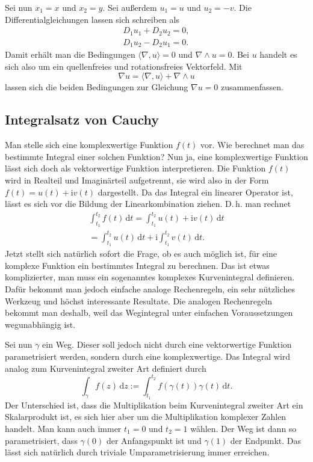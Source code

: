 \documentclass[a4paper,11pt,fleqn,twocolumn,twoside]{scrartcl}
\numberwithin{equation}{section}
\newcommand{\ui}{\mathrm i}
\begin{document}
Sei nun $x_1=x$ und $x_2=y$. Sei außerdem $u_1=u$
und $u_2=-v$. Die Differentialgleichungen lassen sich schreiben als
\begin{gather*}
D_1u_1+D_2u_2=0,\\
D_1u_2-D_2u_1=0.
\end{gather*}
Damit erhält man die Bedingungen $\langle\nabla,u\rangle=0$ und
$\nabla\wedge u=0$. Bei $u$ handelt es sich also um ein
quellenfreies und rotationsfreies Vektorfeld. Mit
\begin{equation}
\nabla u = \langle\nabla, u\rangle+\nabla\wedge u
\end{equation}
lassen sich die beiden Bedingungen zur Gleichung $\nabla u=0$
zusammenfassen.

\subsection{Integralsatz von Cauchy}

Man stelle sich eine komplexwertige Funktion $f(t)$ vor.
Wie berechnet man das bestimmte Integral einer solchen Funktion?
Nun ja, eine komplexwertige Funktion lässt sich doch als vektorwertige
Funktion interpretieren. Die Funktion $f(t)$ wird in Realteil und
Imaginärteil aufgetrennt, sie wird also in der Form
$f(t)=u(t)+\ui v(t)$ dargestellt.
Da das Integral ein linearer Operator ist,
lässt es sich vor die Bildung der Linearkombination ziehen.
D.\,h. man rechnet
\begin{gather*}
\int_{t_1}^{t_2} f(t)\,\mathrm dt
= \int_{t_1}^{t_2} u(t)+\ui v(t)\,\mathrm dt\\
= \int_{t_1}^{t_2} u(t)\,\mathrm dt + \ui\int_{t_1}^{t_2}
v(t)\,\mathrm dt.
\end{gather*}
Jetzt stellt sich natürlich sofort die Frage, ob es auch möglich ist,
für eine komplexe Funktion ein bestimmtes Integral zu berechnen.
Das ist etwas komplizierter, man muss ein sogenanntes komplexes
Kurvenintegral definieren. Dafür bekommt man jedoch einfache analoge
Rechenregeln, ein sehr nützliches Werkzeug und höchst interessante
Resultate. Die analogen Rechenregeln bekommt man deshalb,
weil das Wegintegral unter einfachen Voraussetzungen
wegunabhängig ist.

Sei nun $\gamma$ ein Weg. Dieser soll jedoch nicht durch eine
vektorwertige Funktion parametrisiert werden, sondern durch
eine komplexwertige. Das Integral wird analog zum Kurvenintegral
zweiter Art definiert durch
\begin{equation}
\int_\gamma f(z)\,\mathrm dz
:= \int_{t_1}^{t_2} f(\gamma(t))\gamma(t)\,\mathrm dt.
\end{equation}
Der Unterschied ist, dass die Multiplikation beim Kurvenintegral
zweiter Art ein Skalarprodukt ist, es sich hier aber um die
Multiplikation komplexer Zahlen handelt.
Man kann auch immer $t_1=0$ und $t_2=1$ wählen.
Der Weg ist dann so parametrisiert, dass $\gamma(0)$
der Anfangspunkt ist und $\gamma(1)$ der Endpunkt. Das lässt
sich natürlich durch triviale Umparametrisierung immer erreichen.
\end{document}
